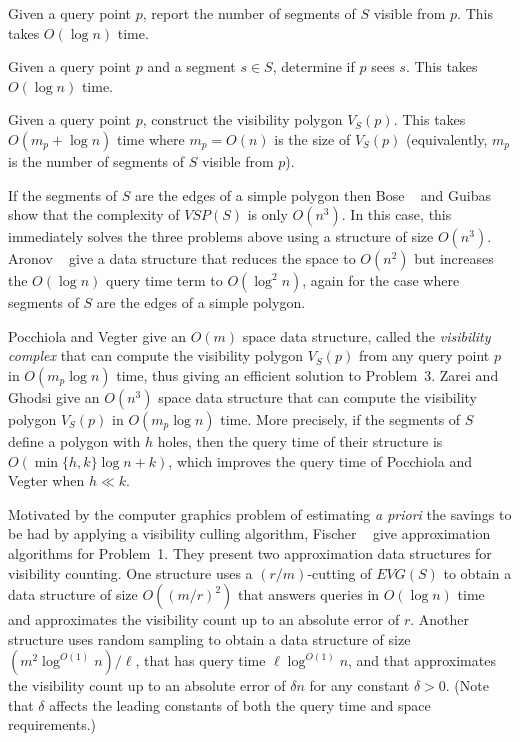 \documentclass{patmorin}
\newcommand{\EVG}{\mathit{EVG}}
\newcommand{\VSP}{\mathit{VSP}}
\begin{document}
\begin{prb}
  Given a query point $p$, report the number of segments of $S$ visible
  from $p$.  This takes $O(\log n)$ time.
\end{prb}

\begin{prb}
  Given a query point $p$ and a segment $s\in S$, determine if $p$
  sees $s$.  This takes $O(\log n)$ time.
\end{prb}

\begin{prb}
  Given a query point $p$, construct the visibility polygon $V_S(p)$.
  This takes $O(m_p+\log n)$ time where $m_p=O(n)$ is the size of $V_S(p)$
  (equivalently, $m_p$ is the number of segments of $S$ visible from $p$).
\end{prb}

If the segments of $S$ are the edges of a simple polygon then Bose \etal\
\cite{blm02} and Guibas \etal\ \cite{gmr97} show that the complexity of
$\VSP(S)$ is only $O(n^3)$.  In this case, this immediately solves the
three problems above using a structure of size $O(n^3)$.  Aronov \etal\
\cite{agtz02} give a data structure that reduces the space to $O(n^2)$
but increases the $O(\log n)$ query time term to $O(\log^2 n)$, again
for the case where segments of $S$ are the edges of a simple polygon.

Pocchiola and Vegter \cite{pv96} give an $O(m)$ space data structure,
called the \emph{visibility complex} that can compute the visibility
polygon $V_S(p)$ from any query point $p$ in $O(m_p \log n)$ time,
thus giving an efficient solution to Problem~3.  Zarei and Ghodsi give
an $O(n^3)$ space data structure that can compute the visibility polygon
$V_S(p)$ in $O(m_p \log n)$ time.  More precisely, if the segments of $S$
define a polygon with $h$ holes, then the query time of their structure
is $O(\min\{h,k\}\log n + k)$, which improves the query time of Pocchiola
and Vegter when $h \ll k$.

Motivated by the computer graphics problem of estimating \emph{a priori}
the savings to be had by applying a visibility culling algorithm,
Fischer \etal\ \cite{fhjmz08,fhjmz09} give approximation algorithms for
Problem~1.  They present two approximation data structures for visibility
counting. One structure uses a $(r/m)$-cutting \cite[Section~4.5]{m02}
of $\EVG(S)$ to obtain a data structure of size $O((m/r)^2)$ that answers
queries in $O(\log n)$ time and approximates the visibility count up to
an absolute error of $r$.  Another structure uses random sampling to
obtain a data structure of size $(m^2\log^{O(1)} n)/\ell$, that has query
time $\ell\log^{O(1)} n$, and that approximates the visibility count up to
an absolute error of $\delta n$ for any constant $\delta > 0$.  (Note that
$\delta$ affects the leading constants of both the query time and space
requirements.)
\end{document}
